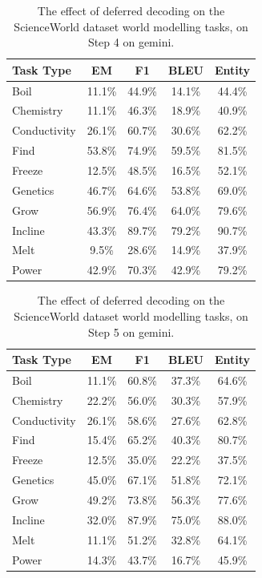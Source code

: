 \begin{table}[h]
\centering
    \setlength\tabcolsep{15pt}
    \setlength\extrarowheight{0pt}
\caption{The effect of deferred decoding on the ScienceWorld dataset \citep{wang-etal-2022-scienceworld} world modelling tasks, on Step 4 on gemini.}
\label{tab:scienceworld33}
\begin{tabular}{lcccc}
\toprule
\textbf{Task Type} & \textbf{EM} & \textbf{F1}
  & \textbf{BLEU} & \textbf{Entity}\\
\midrule
Boil & 11.1\% & 44.9\% & 14.1\% & 44.4\% \\
Chemistry & 11.1\% & 46.3\% & 18.9\% & 40.9\% \\
Conductivity & 26.1\% & 60.7\% & 30.6\% & 62.2\% \\
Find & 53.8\% & 74.9\% & 59.5\% & 81.5\% \\
Freeze & 12.5\% & 48.5\% & 16.5\% & 52.1\% \\
Genetics & 46.7\% & 64.6\% & 53.8\% & 69.0\% \\
Grow & 56.9\% & 76.4\% & 64.0\% & 79.6\% \\
Incline & 43.3\% & 89.7\% & 79.2\% & 90.7\% \\
Melt & 9.5\% & 28.6\% & 14.9\% & 37.9\% \\
Power & 42.9\% & 70.3\% & 42.9\% & 79.2\% \\

\bottomrule
\end{tabular}
\end{table}


\begin{table}[h]
\centering
    \setlength\tabcolsep{15pt}
    \setlength\extrarowheight{0pt}
\caption{The effect of deferred decoding on the ScienceWorld dataset \citep{wang-etal-2022-scienceworld} world modelling tasks, on Step 5 on gemini.}
\label{tab:scienceworld34}
\begin{tabular}{lcccc}
\toprule
\textbf{Task Type} & \textbf{EM} & \textbf{F1}
  & \textbf{BLEU} & \textbf{Entity}\\
\midrule
Boil & 11.1\% & 60.8\% & 37.3\% & 64.6\% \\
Chemistry & 22.2\% & 56.0\% & 30.3\% & 57.9\% \\
Conductivity & 26.1\% & 58.6\% & 27.6\% & 62.8\% \\
Find & 15.4\% & 65.2\% & 40.3\% & 80.7\% \\
Freeze & 12.5\% & 35.0\% & 22.2\% & 37.5\% \\
Genetics & 45.0\% & 67.1\% & 51.8\% & 72.1\% \\
Grow & 49.2\% & 73.8\% & 56.3\% & 77.6\% \\
Incline & 32.0\% & 87.9\% & 75.0\% & 88.0\% \\
Melt & 11.1\% & 51.2\% & 32.8\% & 64.1\% \\
Power & 14.3\% & 43.7\% & 16.7\% & 45.9\% \\

\bottomrule
\end{tabular}
\end{table}

